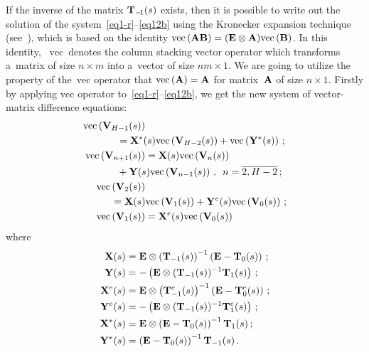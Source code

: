 \begin{multicols}{2}
If the inverse of the matrix $\mathbf{T}_{-\!1}(s)$ exists, then 
it is possible to write out the solution of the system~\eqref{eq1-r}--\eqref{eq12b}
using the Kronecker expansion technique (see~\cite{Steeb,Graham,Telek}),
which is based on the identity $\mathrm{vec}\,(\mathbf{A}\mathbf{B})=
(\mathbf{E} \otimes \mathbf{A}) \mathrm{vec}\,(\mathbf{B})$.
In this identity, ~$\mathrm{vec}$\ denotes the column stacking vector operator
which transforms a~matrix of size $n \times m$ into a~vector of size $nm \times 1$.
We are going to utilize the property of the~$\mathrm{vec}$ operator 
that $\mathrm{vec}\,(\mathbf{A})=\mathbf{A}$ for matrix~$\mathbf{A}$ of size $n \times 1$.
Firstly by applying $\mathrm{vec}$ operator to~\eqref{eq1-r}--\eqref{eq12b},
we get the new system of vector-matrix difference equations:
\begin{align}
\label{H-1}
\mathrm{vec}\left(\bmx{V}_{H-1}(s)\right)
&\notag\\
&\hspace*{-10mm}{}= \bmx{X}^*(s) \mathrm{vec}\left(\bmx{V}_{H-2}(s)\right) +
\mathrm{vec}\left(\bmx{Y}^*(s)\right)\,;
\\
\label{n}
\mathrm{vec}\left(\bmx{V}_{n+1}(s)\right)&=\bmx{X}(s)
\mathrm{vec}\left(\bmx{V}_n(s)\right)\notag\\
&\hspace*{-10mm}{}+\bmx{Y}(s)
\mathrm{vec}\left(\bmx{V}_{n-1}(s)\right)\,,\enskip
n=\overline{2,H-2}\,;
\\
\label{2}
\mathrm{vec}\left(\bmx{V}_{2}(s)\right)&{}\notag\\
&\hspace*{-12mm}{}=
\bmx{X}(s) \mathrm{vec}\left(\bmx{V}_1(s)\right)+
\bmx{Y}^e(s) \mathrm{vec}\left(\bmx{V}_{0}(s)\right)\,;
\\
\label{0}
\mathrm{vec}\left(\bmx{V}_{1}(s)\right) &= \bmx{X}^e(s) \mathrm{vec}\left(\bmx{V}_{0}(s)\right)
\end{align}
where
\begin{align*}
\mathbf{X}(s)&= \mathbf{E} \otimes \left(\mathbf{T}_{-1}(s)\right)^{-1}
\left(\mathbf{E}-\mathbf{T}_0(s)\right)\,; \\
 \mathbf{Y}(s)&= - \left(\mathbf{E} \otimes (\mathbf{T}_{-1}(s) )^{-1}
\mathbf{T}_1(s)\right)\,;
\\
\mathbf{X}^e(s)&= \mathbf{E} \otimes \left(\mathbf{T}^e_{-1}(s) \right)^{-1}
\left(\mathbf{E}-\mathbf{T}^e_0(s)\right)\,; \\
\mathbf{Y}^e(s)&=- \left(\mathbf{E} \otimes (\mathbf{T}_{-1}(s) )^{-1}
\mathbf{T}^e_1(s)\right)\,;\\
\mathbf{X}^*(s)&=
\mathbf{E} \otimes \left(\mathbf{E}-\mathbf{T}_0(s)\right)^{-1} \mathbf{T}_{1}(s) \,; \\ 
\mathbf{Y}^*(s)&=\left(\mathbf{E}-\mathbf{T}_0(s)\right)^{-1} \mathbf{T}_{-1}(s)\,.
\end{align*}


\end{multicols}
